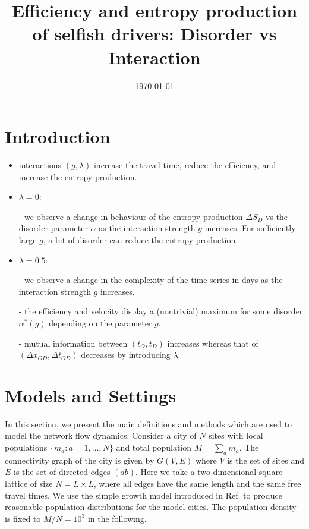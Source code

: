 \documentclass[aps,preprint]{revtex4-1}
\begin{document}
\title{Efficiency and entropy production of selfish drivers: Disorder vs Interaction}



\date{\today}




\maketitle

\section{Introduction}\label{S0}

\begin{itemize}

\item interactions $(g,\lambda)$ increase the travel time, reduce the efficiency, and increase the entropy production.


\item $\lambda=0$: 

- we observe a change in behaviour of the entropy production $\Delta S_D$ vs the disorder parameter $\alpha$ as the interaction strength $g$ increases.  For sufficiently large $g$, a bit of disorder can reduce the entropy production. 


\item $\lambda=0.5$: 

- we observe a change in the complexity of the time series in days as the interaction strength $g$ increases.

- the efficiency and velocity display a (nontrivial) maximum for some disorder $\alpha^*(g)$ depending on the parameter $g$.  

- mutual information between $(t_O,t_D)$ increases whereas that of $(\Delta x_{OD},\Delta t_{OD})$ decreases by introducing $\lambda$. 



\end{itemize}


\section{Models and Settings}\label{S1}
In this section, we present the main definitions and methods which are used to model the network flow dynamics.   
Consider a city of $N$ sites with local populations $\{m_a:a=1,\dots,N\}$ and total population $M=\sum_a m_a$. The connectivity graph of the city is given by $G(V,E)$ where $V$ is the set of sites and $E$ is the set of directed edges $(ab)$. Here we take a two dimensional square lattice of size $N=L\times L$, where all edges have the same length and the same free travel times. We use the simple growth model introduced in Ref. \cite{Li-nc-2017} to produce reasonable population distributions for the model cities. The population density is fixed to $M/N=10^3$ in the following.
\end{document}
